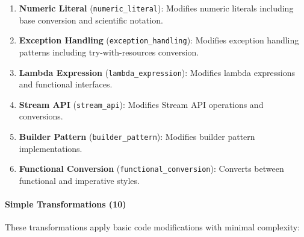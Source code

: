 \documentclass[acmsmall,screen,review,anonymous]{acmart}
\begin{document}
\begin{enumerate}
    \item \textbf{Numeric Literal} (\texttt{numeric\_literal}): Modifies numeric literals including base conversion and scientific notation.
    
    \item \textbf{Exception Handling} (\texttt{exception\_handling}): Modifies exception handling patterns including try-with-resources conversion.
    
    \item \textbf{Lambda Expression} (\texttt{lambda\_expression}): Modifies lambda expressions and functional interfaces.
    
    \item \textbf{Stream API} (\texttt{stream\_api}): Modifies Stream API operations and conversions.
    
    \item \textbf{Builder Pattern} (\texttt{builder\_pattern}): Modifies builder pattern implementations.
    
    \item \textbf{Functional Conversion} (\texttt{functional\_conversion}): Converts between functional and imperative styles.
\end{enumerate}

\paragraph{Simple Transformations (10)}
These transformations apply basic code modifications with minimal complexity:
\end{document}
